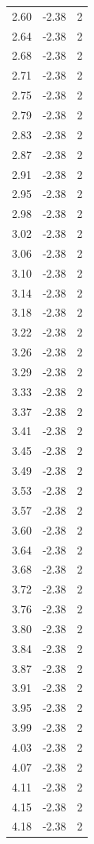 \begin{longtable}{lrr}
  2.60 & -2.38 & 2 \\
  2.64 & -2.38 & 2 \\
  2.68 & -2.38 & 2 \\
  2.71 & -2.38 & 2 \\
  2.75 & -2.38 & 2 \\
  2.79 & -2.38 & 2 \\
  2.83 & -2.38 & 2 \\
  2.87 & -2.38 & 2 \\
  2.91 & -2.38 & 2 \\
  2.95 & -2.38 & 2 \\
  2.98 & -2.38 & 2 \\
  3.02 & -2.38 & 2 \\
  3.06 & -2.38 & 2 \\
  3.10 & -2.38 & 2 \\
  3.14 & -2.38 & 2 \\
  3.18 & -2.38 & 2 \\
  3.22 & -2.38 & 2 \\
  3.26 & -2.38 & 2 \\
  3.29 & -2.38 & 2 \\
  3.33 & -2.38 & 2 \\
  3.37 & -2.38 & 2 \\
  3.41 & -2.38 & 2 \\
  3.45 & -2.38 & 2 \\
  3.49 & -2.38 & 2 \\
  3.53 & -2.38 & 2 \\
  3.57 & -2.38 & 2 \\
  3.60 & -2.38 & 2 \\
  3.64 & -2.38 & 2 \\
  3.68 & -2.38 & 2 \\
  3.72 & -2.38 & 2 \\
  3.76 & -2.38 & 2 \\
  3.80 & -2.38 & 2 \\
  3.84 & -2.38 & 2 \\
  3.87 & -2.38 & 2 \\
  3.91 & -2.38 & 2 \\
  3.95 & -2.38 & 2 \\
  3.99 & -2.38 & 2 \\
  4.03 & -2.38 & 2 \\
  4.07 & -2.38 & 2 \\
  4.11 & -2.38 & 2 \\
  4.15 & -2.38 & 2 \\
  4.18 & -2.38 & 2 \\

\end{longtable}
